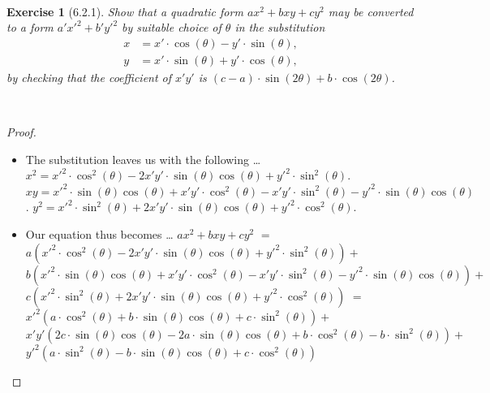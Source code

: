 \documentclass[12pt]{article}
\newcommand{\XB}{\color{black}}
\newcommand{\XBB}{\color{blue}}
\newcommand{\ds}{\displaystyle}
\theoremstyle{plain}
\newtheorem{ex}{Exercise}
\begin{document}
\XBB\hrulefill\XB \\
\begin{ex} [6.2.1]
  Show that a \emph{quadratic form} $ \ds ax^{2} + bxy + cy^{2} $ may be converted to a form
  $ \ds a'x'^{2} + b'y'^{2} $ by suitable choice of $ \theta $ in the substitution
  \begin{align*}
    x &= x' \cdot \cos(\theta) - y' \cdot \sin(\theta), \\
    y &= x' \cdot \sin(\theta) + y' \cdot \cos(\theta),
  \end{align*}
  by checking that the coefficient of $ x' y' $ is $ (c - a) \cdot \sin(2\theta) + b \cdot \cos(2\theta) $.
\end{ex}
\XBB\hrulefill\XB \\

\begin{proof}
  \ \\

  \begin{itemize}
    \item The substitution leaves us with the following \dots
    \subitem $ \ds x^{2} = x'^{2} \cdot \cos^{2}(\theta) - 2 x'y' \cdot \sin(\theta) \cos(\theta) + y'^{2} \cdot \sin^{2}(\theta) $.
    \subitem $ \ds xy = x'^{2} \cdot \sin(\theta) \cos(\theta) + x'y' \cdot \cos^{2}(\theta) - x'y' \cdot \sin^{2}(\theta) - y'^{2} \cdot \sin(\theta) \cos(\theta) $.
    \subitem $ \ds y^{2} = x'^{2} \cdot \sin^{2}(\theta) + 2 x'y' \cdot \sin(\theta) \cos(\theta) + y'^{2} \cdot \cos^{2}(\theta) $.
    \item Our equation thus becomes \dots
    \subitem $ \ds ax^{2} + bxy + cy^{2} $
    \subitem $ \ds = $
    \subitem $ \ds a ( x'^{2} \cdot \cos^{2}(\theta) - 2 x'y' \cdot \sin(\theta) \cos(\theta) + y'^{2} \cdot \sin^{2}(\theta) ) + $
    \subitem $ \ds b ( x'^{2} \cdot \sin(\theta) \cos(\theta) + x'y' \cdot \cos^{2}(\theta) - x'y' \cdot \sin^{2}(\theta) - y'^{2} \cdot \sin(\theta) \cos(\theta) ) + $
    \subitem $ \ds c ( x'^{2} \cdot \sin^{2}(\theta) + 2 x'y' \cdot \sin(\theta) \cos(\theta) + y'^{2} \cdot \cos^{2}(\theta) ) $
    \subitem $ \ds = $
    \subitem $ \ds x'^{2} ( a \cdot \cos^{2}(\theta) + b \cdot \sin(\theta) \cos(\theta) + c \cdot \sin^{2}(\theta) ) + $
    \subitem $ \ds x'y' ( 2c \cdot \sin(\theta) \cos(\theta) - 2a \cdot \sin(\theta) \cos(\theta) + b \cdot \cos^{2}(\theta) - b \cdot \sin^{2}(\theta)) + $
    \subitem $ \ds y'^{2} ( a \cdot \sin^{2}(\theta) - b \cdot \sin(\theta) \cos(\theta) + c \cdot \cos^{2}(\theta) ) $
  \end{itemize}


\end{proof}
\end{document}

